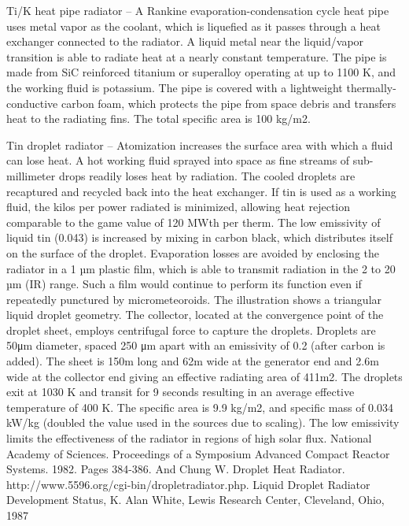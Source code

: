 \documentclass[a4paper]{book}
\begin{document}
Ti/K heat pipe radiator – A Rankine evaporation-condensation cycle heat pipe uses metal vapor as the coolant, which is liquefied as it passes through a heat exchanger connected to the radiator. A liquid metal near the liquid/vapor transition is able to radiate heat at a nearly constant temperature. The pipe is made from SiC reinforced titanium or superalloy operating at up to 1100 K, and the working fluid is potassium. The pipe is covered with a lightweight thermally-conductive carbon foam, which protects the pipe from space debris and transfers heat to the radiating fins. The total specific area is 100 kg/m2.
 
Tin droplet radiator – Atomization increases the surface area with which a fluid can lose heat. A hot working fluid sprayed into space as fine streams of sub-millimeter drops readily loses heat by radiation.  The cooled droplets are recaptured and recycled back into the heat exchanger.  If tin is used as a working fluid, the kilos per power radiated is minimized, allowing heat rejection comparable to the game value of 120 MWth per therm. The low emissivity of liquid tin (0.043) is increased by mixing in carbon black, which distributes itself on the surface of the droplet. Evaporation losses are avoided by enclosing the radiator in a 1 µm plastic film, which is able to transmit radiation in the 2 to 20 µm (IR) range.  Such a film would continue to perform its function even if repeatedly punctured by micrometeoroids.  The illustration shows a triangular liquid droplet geometry.  The collector, located at the convergence point of the droplet sheet, employs centrifugal force to capture the droplets. Droplets are 50μm diameter, spaced 250 μm apart with an emissivity of 0.2 (after carbon is added). The sheet is 150m long and 62m wide at the generator end and 2.6m wide at the collector end giving an effective radiating area of 411m2.   The droplets exit at 1030 K and transit for 9 seconds resulting in an average effective temperature of 400 K.  The specific area is 9.9 kg/m2, and specific mass of 0.034 kW/kg (doubled the value used in the sources due to scaling).  The low emissivity limits the effectiveness of the radiator in regions of high solar flux.
National Academy of Sciences. Proceedings of a Symposium Advanced Compact Reactor Systems. 1982. Pages 384-386.  And Chung W. Droplet Heat Radiator. http://www.5596.org/cgi-bin/dropletradiator.php. Liquid Droplet Radiator Development Status, K. Alan White, Lewis Research Center, Cleveland, Ohio, 1987 
 
\end{document}
